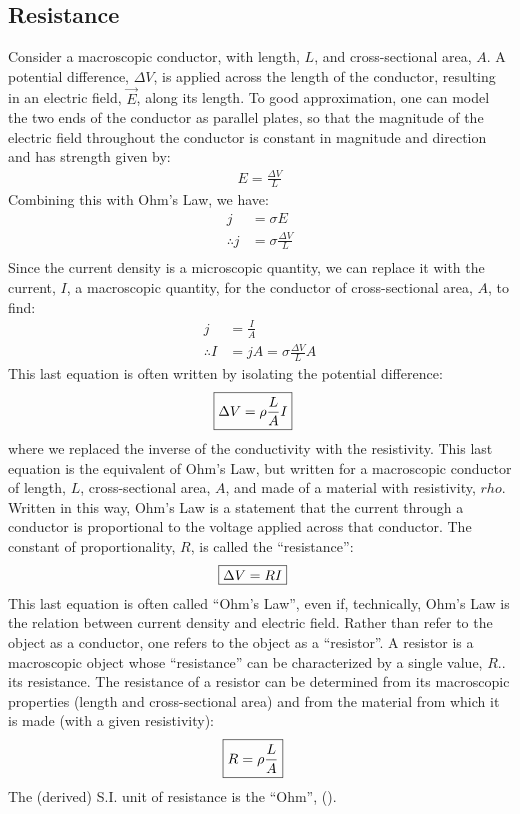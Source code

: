 \subsection{Resistance}
Consider a macroscopic conductor, with length, $L$, and cross-sectional area, $A$. A potential difference, $\Delta V$, is applied across the length of the conductor, resulting in an electric field, $\vec E$, along its length. To good approximation, one can model the two ends of the conductor as parallel plates, so that the magnitude of the electric field throughout the conductor is constant in magnitude and direction and has strength given by:
\begin{align*}
E=\frac{\Delta V}{L}
\end{align*}
Combining this with Ohm's Law, we have:
\begin{align*}
j&=\sigma E\\
\therefore j&=\sigma\frac{\Delta V}{L}\\
\end{align*}
Since the current density is a microscopic quantity, we can replace it with the current, $I$, a macroscopic quantity, for the conductor of cross-sectional area, $A$, to find:
\begin{align*}
j&=\frac{I}{A}\\
\therefore I&=jA=\sigma\frac{\Delta V}{L}A
\end{align*}
This last equation is often written by isolating the potential difference:
\begin{align*}
\Aboxed{\Delta V = \rho \frac{L}{A} I}
\end{align*}
where we replaced the inverse of the conductivity with the resistivity. This last equation is the equivalent of Ohm's Law, but written for a macroscopic conductor of length, $L$, cross-sectional area, $A$, and made of a material with resistivity, $rho$. Written in this way, Ohm's Law is a statement that the current through a conductor is proportional to the voltage applied across that conductor. The constant of proportionality, $R$, is called the ``resistance'':
\begin{align*}
\Aboxed{\Delta V = RI}
\end{align*}
This last equation is often called ``Ohm's Law'', even if, technically, Ohm's Law is the relation between current density and electric field. Rather than refer to the object as a conductor, one refers to the object as a ``resistor''. A resistor is a macroscopic object whose ``resistance'' can be characterized by a single value, $R$.. its resistance. The resistance of a resistor can be determined from its macroscopic properties (length and cross-sectional area) and from the material from which it is made (with a given resistivity):
\begin{align*}
\Aboxed{R = \rho \frac{L}{A} }
\end{align*}
The (derived) S.I. unit of resistance is the ``Ohm'', (\si{\Omega}).

